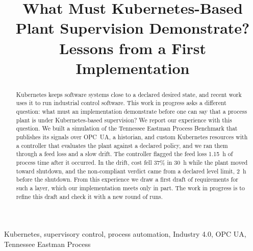 \documentclass[conference]{IEEEtran}
\begin{document}
\title{What Must Kubernetes-Based Plant Supervision Demonstrate?\\
Lessons from a First Implementation}

\author{
\and
{}
}

\maketitle

\begin{abstract}
Kubernetes keeps software systems close to a declared desired state, and recent work uses it to run industrial control software. This work in progress asks a different question: what must an implementation demonstrate before one can say that a process plant is under Kubernetes-based supervision? We report our experience with this question. We built a simulation of the Tennessee Eastman Process Benchmark that publishes its signals over OPC~UA, a historian, and custom Kubernetes resources with a controller that evaluates the plant against a declared policy, and we ran them through a feed loss and a slow drift. The controller flagged the feed loss 1.15~h of process time after it occurred. In the drift, cost fell 37\% in 30~h while the plant moved toward shutdown, and the non-compliant verdict came from a declared level limit, 2~h before the shutdown. From this experience we draw a first draft of requirements for such a layer, which our implementation meets only in part. The work in progress is to refine this draft and check it with a new round of runs.
\end{abstract}

\begin{IEEEkeywords}
Kubernetes, supervisory control, process automation, Industry 4.0, OPC UA, Tennessee Eastman Process
\end{IEEEkeywords}
\end{document}
